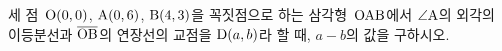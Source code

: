 세 점~$\mathrm{O}(0{,}\mkern3mu\mathopen{}0)$, $\mathrm{A}(0{,}\mkern3mu\mathopen{}6)$, $\mathrm{B}(4{,}\mkern3mu\mathopen{}3)$을 꼭짓점으로 하는 삼각형~$\mathrm{OAB}$에서 $\angle\mathrm{A}$의 외각의 이등분선과 $\overline{\mathrm{OB}}$의 연장선의 교점을 $\mathrm{D}(a{,}\mkern3mu\mathopen{}b)$라 할 때, $a-b$의 값을 구하시오.

